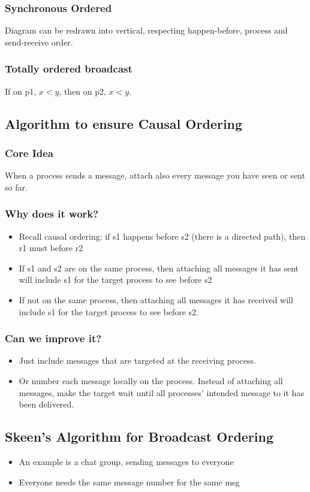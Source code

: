 \documentclass[11pt]{article}
\begin{document}
\subsubsection{Synchronous Ordered}
\label{sec:org123bf22}
Diagram can be redrawn into vertical, respecting happen-before, process and
send-receive order.
\subsubsection{Totally ordered broadcast}
\label{sec:orgcc154a7}
If on p1, \(x<y\), then on p2, \(x<y\).
\subsection{Algorithm to ensure Causal Ordering}
\label{sec:orgb9f86ff}
\subsubsection{Core Idea}
\label{sec:orge2b85e4}
When a process sends a message, attach also every message you have seen or sent
so far.
\subsubsection{Why does it work?}
\label{sec:org8db7b42}
\begin{itemize}
\item Recall causal ordering: if s1 happens before s2 (there is a directed path),
then r1 must before r2
\item If s1 and s2 are on the same process, then attaching all messages it has sent
will include s1 for the target process to see before s2
\item If not on the same process, then attaching all messages it has received will
include s1 for the target process to see before s2.
\end{itemize}
\subsubsection{Can we improve it?}
\label{sec:org767358d}
\begin{itemize}
\item Just include messages that are targeted at the receiving process.
\item Or number each message locally on the process. Instead of attaching all
messages, make the target wait until all processes' intended message to it has
been delivered.
\end{itemize}
\subsection{Skeen's Algorithm for Broadcast Ordering}
\label{sec:org0286fe7}
\begin{itemize}
\item An example is a chat group, sending messages to everyone
\item Everyone needs the same message number for the same msg
\end{itemize}
\end{document}
